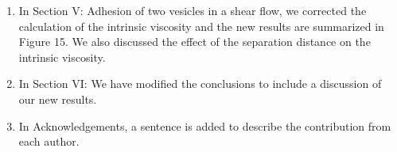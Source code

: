 \documentclass[11pt]{article}
\begin{document}
\begin{enumerate}
\item In Section V: Adhesion of two vesicles in a shear flow, we
  corrected the calculation of the intrinsic viscosity and the new
    results are summarized in Figure 15.  We also discussed the effect
    of the separation distance on the intrinsic viscosity.

\item In Section VI: We have modified the conclusions to include a
  discussion of our new results.

\item In Acknowledgements,  a sentence is added to describe the contribution from each author.


\end{enumerate}
\end{document}
